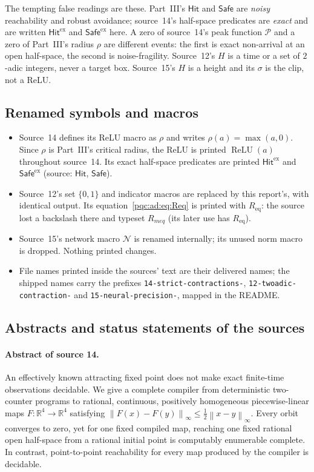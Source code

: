 \documentclass[11pt,letterpaper]{article}
\numberwithin{equation}{section}
\theoremstyle{definition}
\theoremstyle{remark}
\newcommand{\R}{\mathbb R}
\newcommand{\code}[1]{\nolinkurl{#1}}
\newcommand{\norm}[1]{\left\lVert #1\right\rVert_{\infty}}
\newcommand{\ReLU}{\operatorname{ReLU}}
\newcommand{\Peak}{\mathcal P}
\newcommand{\HitEx}{\mathsf{Hit}^{\mathrm{ex}}}
\newcommand{\SafeEx}{\mathsf{Safe}^{\mathrm{ex}}}
\begin{document}
The tempting false readings are these. Part~III's $\mathsf{Hit}$ and
$\mathsf{Safe}$ are \emph{noisy} reachability and robust avoidance; source~14's
half-space predicates are \emph{exact} and are written $\HitEx$ and $\SafeEx$
here. A zero of source~14's peak function $\Peak$ and a zero of Part~III's
radius $\rho$ are different events: the first is exact non-arrival at an open
half-space, the second is noise-fragility. Source~12's $H$ is a time or a set of
$2$-adic integers, never a target box. Source~15's $H$ is a height and its
$\sigma$ is the clip, not a ReLU.

\subsection{Renamed symbols and macros}
\begin{itemize}
\item Source~14 defines its ReLU macro as $\rho$ and writes $\rho(a)=\max(a,0)$.
Since $\rho$ is Part~III's critical radius, the ReLU is printed $\ReLU(a)$
throughout source~14. Its exact half-space predicates are printed $\HitEx$ and
$\SafeEx$ (source: $\mathsf{Hit}$, $\mathsf{Safe}$).
\item Source~12's set $\{0,1\}$ and indicator macros are replaced by this
report's, with identical output. Its equation~\eqref{pqc:ad:eq:Req} is printed
with $R_{\mathrm{eq}}$: the source lost a backslash there and typeset
$R_{meq}$ (its later use has $R_{\mathrm{eq}}$).
\item Source~15's network macro $\mathcal N$ is renamed internally; its
unused norm macro is dropped. Nothing printed changes.
\item File names printed inside the sources' text are their delivered names;
the shipped names carry the prefixes \code{14-strict-contractions-},
\code{12-twoadic-contraction-} and \code{15-neural-precision-}, mapped in the
README.
\end{itemize}

\subsection{Abstracts and status statements of the sources}
\paragraph{Abstract of source 14.}
An effectively known attracting fixed point does not make exact finite-time
observations decidable. We give a complete compiler from deterministic
two-counter programs to rational, continuous, positively homogeneous
piecewise-linear maps $F:\R^4\to\R^4$ satisfying
$\norm{F(x)-F(y)}\le\frac12\norm{x-y}$. Every orbit converges to zero,
yet for one fixed compiled map, reaching one fixed rational open half-space
from a rational initial point is computably enumerable complete. In contrast,
point-to-point reachability for every map produced by the compiler is decidable.
\end{document}
